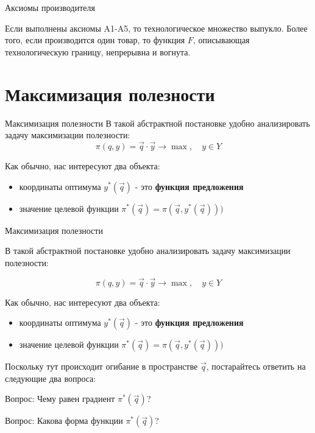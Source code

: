 \documentclass{beamer}
\begin{document}
\begin{frame}{Аксиомы производителя}
\begin{theorem}[БЖЦ]

Если выполнены аксиомы A1-A5, то технологическое множество выпукло. Более того, если производится один товар, то функция $F$, описывающая технологическую границу, непрерывна и вогнута.
\end{theorem}

\end{frame}

\section{Максимизация полезности}

\begin{frame}{Максимизация полезности}
В такой абстрактной постановке удобно анализировать задачу максимизации полезности:
$$ \pi(q, y) = \vec q \cdot \vec y \to \max, \quad y \in Y$$

Как обычно, нас интересуют два объекта:

\begin{itemize}
\item координаты оптимума $y^{\ast}(\vec q)$ - это \textbf{функция предложения}
\item значение целевой функции $\pi^{\ast}(\vec q) = \pi(\vec q, y^{\ast}(\vec q)))$
\end{itemize}

\end{frame}

\begin{frame}{Максимизация полезности}

В такой абстрактной постановке удобно анализировать задачу максимизации полезности:

$$ \pi(q, y) = \vec q \cdot \vec y \to \max, \quad y \in Y$$

Как обычно, нас интересуют два объекта:

\begin{itemize}
\item координаты оптимума $y^{\ast}(\vec q)$ - это \textbf{функция предложения}
\item значение целевой функции $\pi^{\ast}(\vec q) = \pi(\vec q, y^{\ast}(\vec q)))$
\end{itemize}

Поскольку тут происходит огибание в пространстве $\vec q$, постарайтесь ответить на следующие два вопроса:

Вопрос: Чему равен градиент $\pi^{\ast}(\vec q)$?

Вопрос: Какова форма функции $\pi^{\ast}(\vec q)$?

\end{frame}
\end{document}
